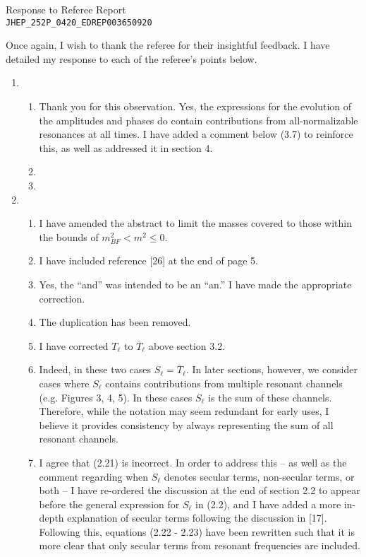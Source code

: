 \documentclass[11pt,letterpaper]{article}
\begin{document}
\vspace{.2in}
\begin{center}
    {\Large Response to Referee Report \\ \verb+JHEP_252P_0420_EDREP003650920+}  
\end{center}

\vspace{.25in}

Once again, I wish to thank the referee for their insightful feedback. I have detailed my response to each of the referee's points below.

\begin{enumerate}
    \item %
    \begin{enumerate}
        \item Thank you for this observation. Yes, the expressions for the evolution of the amplitudes and phases do contain contributions from all-normalizable resonances at all times. I have added a comment below (3.7) to reinforce this, as well as addressed it in section 4.
        \item 
        \item
    \end{enumerate}
    \item %
    \begin{enumerate}
        \item I have amended the abstract to limit the masses covered to those within the bounds of $m^2_{BF} < m^2 \leq 0$.
        \item I have included reference [26] at the end of page 5. 
        \item Yes, the ``and'' was intended to be an ``an.'' I have made the appropriate correction.
        \item The duplication has been removed.
        \item I have corrected $T_\ell$ to $\overline{T}_\ell$ above section 3.2.
        \item Indeed, in these two cases $S_\ell = \overline{T}_\ell$.  In later sections, however, we consider cases where $S_\ell$ contains contributions from multiple resonant channels (e.g. Figures 3, 4, 5). In these cases $S_\ell$ is the sum of these channels. Therefore, while the notation may seem redundant for early uses, I believe it provides consistency by always representing the sum of all resonant channels. 
        \item I agree that (2.21) is incorrect. In order to address this -- as well as the comment regarding when $S_\ell$ denotes secular terms, non-secular terms, or both -- I have re-ordered the discussion at the end of section 2.2 to appear before the general expression for $S_\ell$ in (2.2), and I have added a more in-depth explanation of secular terms following the discussion in [17]. Following this, equations (2.22 - 2.23) have been rewritten such that it is more clear that only secular terms from resonant frequencies are included.
    \end{enumerate} 
\end{enumerate}
\end{document}
